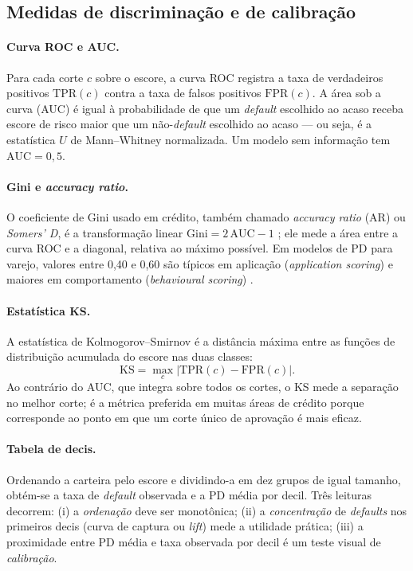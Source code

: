 \documentclass[11pt,a4paper]{article}
\newcommand{\auc}{\mathrm{AUC}}
\newcommand{\ks}{\mathrm{KS}}
\begin{document}
\subsection{Medidas de discriminação e de calibração}
\label{sec:metricas}

\paragraph{Curva ROC e AUC.} Para cada corte $c$ sobre o escore, a curva ROC registra a taxa de verdadeiros positivos $\mathrm{TPR}(c)$ contra a taxa de falsos positivos $\mathrm{FPR}(c)$. A área sob a curva (AUC) é igual à probabilidade de que um \emph{default} escolhido ao acaso receba escore de risco maior que um não-\emph{default} escolhido ao acaso \citep{hanley1982} --- ou seja, é a estatística $U$ de Mann--Whitney normalizada. Um modelo sem informação tem $\auc=0{,}5$.

\paragraph{Gini e \emph{accuracy ratio}.} O coeficiente de Gini usado em crédito, também chamado \emph{accuracy ratio} (AR) ou \emph{Somers' D}, é a transformação linear $\mathrm{Gini}=2\,\auc-1$ \citep{engelmann2003}; ele mede a área entre a curva ROC e a diagonal, relativa ao máximo possível. Em modelos de PD para varejo, valores entre 0{,}40 e 0{,}60 são típicos em aplicação (\emph{application scoring}) e maiores em comportamento (\emph{behavioural scoring}) \citep{siddiqi2017}.

\paragraph{Estatística KS.} A estatística de Kolmogorov--Smirnov é a distância máxima entre as funções de distribuição acumulada do escore nas duas classes:
\begin{equation}
\ks = \max_c \big|\mathrm{TPR}(c)-\mathrm{FPR}(c)\big| .
\end{equation}
Ao contrário do AUC, que integra sobre todos os cortes, o KS mede a separação no melhor corte; é a métrica preferida em muitas áreas de crédito porque corresponde ao ponto em que um corte único de aprovação é mais eficaz.

\paragraph{Tabela de decis.} Ordenando a carteira pelo escore e dividindo-a em dez grupos de igual tamanho, obtém-se a taxa de \emph{default} observada e a PD média por decil. Três leituras decorrem: (i) a \emph{ordenação} deve ser monotônica; (ii) a \emph{concentração} de \emph{defaults} nos primeiros decis (curva de captura ou \emph{lift}) mede a utilidade prática; (iii) a proximidade entre PD média e taxa observada por decil é um teste visual de \emph{calibração}.
\end{document}
